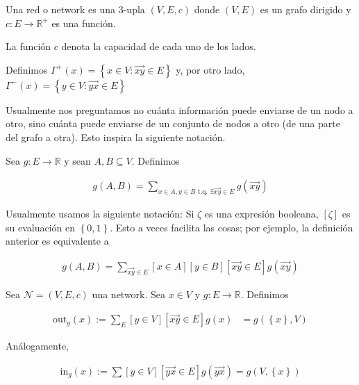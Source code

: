 \documentclass[a4paper]{article}
\begin{document}
\begin{definition}
    Una red o network es una $3$-upla $(V, E, c)$ donde $(V, E)$ es un grafo
    dirigido y $c : E \to \mathbb{R}^{+}$ es una función.
\end{definition}

La función $c$ denota la capacidad de cada uno de los lados.

\begin{definition}[Vecinos]
    Definimos $\Gamma^{+}(x) = \left\{ x \in V : \overrightarrow{xy} \in E \right\} $ y,
    por otro lado,
    $\Gamma^{-}(x) = \left\{ y \in V : \overrightarrow{yx} \in E \right\} $
\end{definition}

Usualmente nos preguntamos no cuánta información puede enviarse de un nodo a
otro, sino cuánta puede enviarse de un conjunto de nodos a otro (de una parte
del grafo a otra). Esto inspira la siguiente notación.

\begin{definition}
    Sea $g : E \to \mathbb{R}$ y sean $A, B \subseteq V$. Definimos  

    \begin{align*}
        g(A, B) = \sum_{x \in A, y \in B \text{ t.q. } \exists \overrightarrow{xy} \in E}
        g(\overrightarrow{xy})
    \end{align*}
\end{definition}

Usualmente usamos la siguiente notación: Si $\zeta$ es una expresión booleana,
$[\zeta]$ es su evaluación en $\left\{ 0, 1 \right\} $. Esto a veces facilita
las cosas; por ejemplo, la definición anterior es equivalente a

\begin{align*}
    g(A, B) = \sum_{\overrightarrow{xy} \in E}[x \in A] [y \in B] [\overrightarrow{xy} \in E] g(\overrightarrow{xy})
\end{align*}

\begin{definition}
    Sea $\mathcal{N} = (V, E, c)$ una network. Sea $x \in V$ y $g : E \to
    \mathbb{R}$. Definimos 

    \begin{align*}
        \text{out}_{g}(x) := \sum_{E} [y \in V][\overrightarrow{xy} \in E]g(x) &= g \left(
        \left\{ x \right\}, V  \right) 
    \end{align*}

    Análogamente, 

    \begin{align*}
        \text{in}_g(x) := \sum[y \in V] [\overrightarrow{yx} \in E]g(\overrightarrow{yx}) = g\left( V,
        \left\{ x \right\} \right) 
    \end{align*}
\end{definition}
\end{document}
